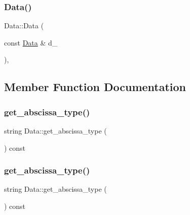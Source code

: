 \mbox{\label{classData_a860bcc89b14c2106e0fc5e33f065fa0f}} 
\subsubsection{\texorpdfstring{Data()}{Data()}\hspace{0.1cm}{\footnotesize\ttfamily [6/6]}}
{\footnotesize\ttfamily Data\+::\+Data (\begin{DoxyParamCaption}\item[{const \mbox{\hyperlink{classData}{Data}} \&}]{d\+\_\+ }\end{DoxyParamCaption})\hspace{0.3cm}{\ttfamily [inline]}, {\ttfamily [protected]}}



\subsection{Member Function Documentation}
\mbox{\label{classData_aeb6b453e589d11d200e711fbd7501e8f}} 
\subsubsection{\texorpdfstring{get\_abscissa\_type()}{get\_abscissa\_type()}\hspace{0.1cm}{\footnotesize\ttfamily [1/2]}}
{\footnotesize\ttfamily string Data\+::get\+\_\+abscissa\+\_\+type (\begin{DoxyParamCaption}{ }\end{DoxyParamCaption}) const\hspace{0.3cm}{\ttfamily [inline]}}

\mbox{\label{classData_aeb6b453e589d11d200e711fbd7501e8f}} 
\subsubsection{\texorpdfstring{get\_abscissa\_type()}{get\_abscissa\_type()}\hspace{0.1cm}{\footnotesize\ttfamily [2/2]}}
{\footnotesize\ttfamily string Data\+::get\+\_\+abscissa\+\_\+type (\begin{DoxyParamCaption}{ }\end{DoxyParamCaption}) const\hspace{0.3cm}{\ttfamily [inline]}}

